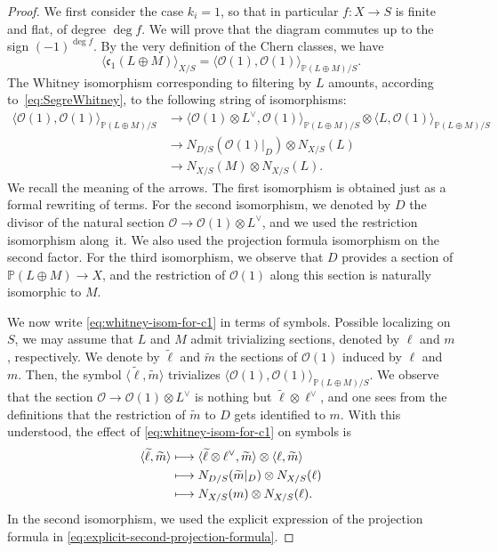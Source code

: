 \documentclass[JEP,XML,SOM,Unicode,published]{cedram}
\newcommand\mto{\mathchoice{\longmapsto}{\mapsto}{\mapsto}{\mapsto}}
\theoremstyle{plain}
\theoremstyle{definition}
\newcommand{\PBbb}{\mathbb P}
\newcommand{\Ocal}{\mathcal O}
\newcommand{\cfrak}{\mathfrak c}
\begin{document}
\begin{proof}
We first consider the case $k_i= 1$, so that in particular $f\colon X\to S$ is finite and flat, of degree $\deg f$. We will prove that the diagram commutes up to the sign $(-1)^{\deg f}$. By the very definition of the Chern classes, we have
\begin{displaymath}
\langle\cfrak_{1}(L\oplus M)\rangle_{X/S}=\langle\Ocal(1),\Ocal(1)\rangle_{\PBbb(L\oplus M)/S}.
\end{displaymath}
The Whitney isomorphism corresponding to filtering by $L$ amounts, according to~\eqref{eq:SegreWhitney}, to the following string of isomorphisms:
\begin{equation}\label{eq:whitney-isom-for-c1}
\begin{split}
\langle\Ocal(1),\Ocal(1)\rangle_{\PBbb(L\oplus M)/S}&\to \langle\Ocal(1)\otimes L^{\vee},\Ocal(1)\rangle_{\PBbb(L\oplus M)/S}\otimes \langle L,\Ocal(1)\rangle_{\PBbb(L\oplus M)/S}\\
&\to N_{D/S}(\Ocal(1)|_{D})\otimes N_{X/S}(L)\\
&\to N_{X/S}(M)\otimes N_{X/S}(L).
\end{split}
\end{equation}
We recall the meaning of the arrows. The first isomorphism is obtained just as a formal rewriting of terms. For the second isomorphism, we denoted by $D$ the divisor of the natural section $\Ocal\to\Ocal(1)\otimes L^{\vee}$, and we used the restriction isomorphism along~it. We also used the projection formula isomorphism on the second factor. For the third isomorphism, we observe that $D$ provides a section of $\PBbb(L\oplus M)\to X$, and the restriction of $\Ocal(1)$ along this section is naturally isomorphic to $M$.

We now write \eqref{eq:whitney-isom-for-c1} in terms of symbols. Possible localizing on $S$, we may assume that $L$ and $M$ admit trivializing sections, denoted by $\ell$ and $m$, respectively. We denote by $\widetilde{\ell}$ and $\widetilde{m}$ the sections of $\Ocal(1)$ induced by $\ell$ and $m$. Then, the symbol $\langle\widetilde{\ell},\widetilde{m}\rangle$ trivializes $\langle\Ocal(1),\Ocal(1)\rangle_{\PBbb(L\oplus M)/S}$. We observe that the section $\Ocal\to\Ocal(1)\otimes L^{\vee}$ is nothing but $\widetilde{\ell}\otimes\ell^{\vee}$, and one sees from the definitions that the restriction of $\widetilde{m}$ to $D$ gets identified to $m$. With this understood, the effect of \eqref{eq:whitney-isom-for-c1} on symbols is
\begin{equation}\label{eq:whitney-isom-for-c1-sections}
\begin{split}
\langle\widetilde{\ell},\widetilde{m}\rangle &\mto \langle\widetilde{\ell}\otimes\ell^{\vee},\widetilde{m}\rangle\otimes \langle \ell,\widetilde{m}\rangle\\
&\mto N_{D/S}(\widetilde{m}|_{D})\otimes N_{X/S}(\ell)\\
&\mto N_{X/S}(m)\otimes N_{X/S}(\ell).
\end{split}
\end{equation}
In the second isomorphism, we used the explicit expression of the projection formula in \eqref{eq:explicit-second-projection-formula}.


\end{proof}
\end{document}
